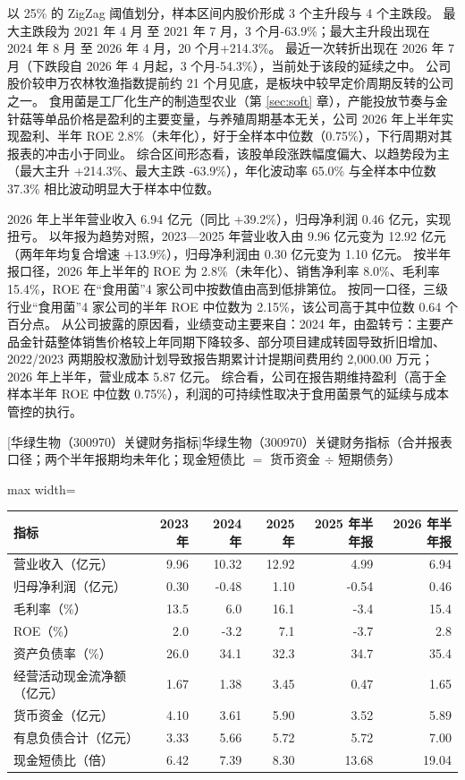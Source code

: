  以 25\% 的 ZigZag 阈值划分，样本区间内股价形成 3 个主升段与 4 个主跌段。 最大主跌段为 2021 年 4 月 至 2021 年 7 月，3 个月-63.9\%；最大主升段出现在 2024 年 8 月 至 2026 年 4 月，20 个月+214.3\%。 最近一次转折出现在 2026 年 7 月（下跌段自 2026 年 4 月起，3 个月-54.3\%），当前处于该段的延续之中。 公司股价较申万农林牧渔指数提前约 21 个月见底，是板块中较早定价周期反转的公司之一。 食用菌是工厂化生产的制造型农业（第 \ref{sec:soft} 章），产能投放节奏与金针菇等单品价格是盈利的主要变量，与养殖周期基本无关，公司 2026 年上半年实现盈利、半年 ROE 2.8\%（未年化），好于全样本中位数（0.75\%），下行周期对其报表的冲击小于同业。 综合区间形态看，该股单段涨跌幅度偏大、以趋势段为主（最大主升 +214.3\%、最大主跌 -63.9\%），年化波动率 65.0\% 与全样本中位数 37.3\% 相比波动明显大于样本中位数。

 2026 年上半年营业收入 6.94 亿元（同比 +39.2\%），归母净利润 0.46 亿元，实现扭亏。 以年报为趋势对照，2023---2025 年营业收入由 9.96 亿元变为 12.92 亿元（两年年均复合增速 +13.9\%），归母净利润由 0.30 亿元变为 1.10 亿元。 按半年报口径，2026 年上半年的 ROE 为 2.8\%（未年化）、销售净利率 8.0\%、毛利率 15.4\%，ROE 在“食用菌”4 家公司中按数值由高到低排第位。 按同一口径，三级行业“食用菌”4 家公司的半年 ROE 中位数为 2.15\%，该公司高于其中位数 0.64 个百分点。 从公司披露的原因看，业绩变动主要来自：2024 年，由盈转亏：主要产品金针菇整体销售价格较上年同期下降较多、部分项目建成转固导致折旧增加、2022/2023 两期股权激励计划导致报告期累计计提期间费用约 2,000.00 万元；2026 年上半年，营业成本 5.87 亿元。 综合看，公司在报告期维持盈利（高于全样本半年 ROE 中位数 0.75\%），利润的可持续性取决于食用菌景气的延续与成本管控的执行。

\begin{center}\small\setlength{\tabcolsep}{3.4pt}
[华绿生物（300970）关键财务指标]{华绿生物（300970）关键财务指标（合并报表口径；两个半年报期均未年化；现金短债比 $=$ 货币资金 $\div$ 短期债务）}
\begin{adjustbox}{max width=\textwidth}
\begin{tabular}{@{}lrrrrr@{}}
\toprule
指标 & 2023 年 & 2024 年 & 2025 年 & 2025 年半年报 & 2026 年半年报 \\
\midrule
营业收入（亿元） & 9.96 & 10.32 & 12.92 & 4.99 & 6.94 \\
归母净利润（亿元） & 0.30 & -0.48 & 1.10 & -0.54 & 0.46 \\
毛利率（\%） & 13.5 & 6.0 & 16.1 & -3.4 & 15.4 \\
ROE（\%） & 2.0 & -3.2 & 7.1 & -3.7 & 2.8 \\
资产负债率（\%） & 26.0 & 34.1 & 32.3 & 34.7 & 35.4 \\
经营活动现金流净额（亿元） & 1.67 & 1.38 & 3.45 & 0.47 & 1.65 \\
货币资金（亿元） & 4.10 & 3.61 & 5.90 & 3.52 & 5.89 \\
有息负债合计（亿元） & 3.33 & 5.66 & 5.72 & 5.72 & 7.00 \\
现金短债比（倍） & 6.42 & 7.39 & 8.30 & 13.68 & 19.04 \\
\bottomrule
\end{tabular}
\end{adjustbox}
\end{center}

